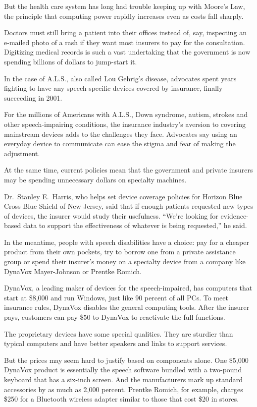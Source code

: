 ﻿\documentclass[12pt]{article}
\begin{document}
But the health care system has long had trouble keeping up with Moore's Law, the principle that
computing power rapidly increases even as costs fall sharply.

Doctors must still bring a patient into their offices instead of, say, inspecting an e-mailed photo
of a rash if they want most insurers to pay for the consultation. Digitizing medical records is such
a vast undertaking that the government is now spending billions of dollars to jump-start it.

In the case of A.L.S., also called Lou Gehrig's disease, advocates spent years fighting to have any
speech-specific devices covered by insurance, finally succeeding in 2001.

For the millions of Americans with A.L.S., Down syndrome, autism, strokes and other speech-impairing
conditions, the insurance industry's aversion to covering mainstream devices adds to the challenges
they face. Advocates say using an everyday device to communicate can ease the stigma and fear of
making the adjustment.

At the same time, current policies mean that the government and private insurers may be spending
unnecessary dollars on specialty machines.

Dr.~Stanley E.~Harris, who helps set device coverage policies for Horizon Blue Cross Blue Shield of
New Jersey, said that if enough patients requested new types of devices, the insurer would study
their usefulness. ``We're looking for evidence-based data to support the effectiveness of whatever
is being requested,'' he said.

In the meantime, people with speech disabilities have a choice: pay for a cheaper product from their
own pockets, try to borrow one from a private assistance group or spend their insurer's money on a
specialty device from a company like DynaVox Mayer-Johnson or Prentke Romich.

DynaVox, a leading maker of devices for the speech-impaired, has computers that start at \$8,000 and
run Windows, just like 90 percent of all PCs. To meet insurance rules, DynaVox disables the general
computing tools. After the insurer pays, customers can pay \$50 to DynaVox to reactivate the full
functions.

The proprietary devices have some special qualities. They are sturdier than typical computers and
have better speakers and links to support services.

But the prices may seem hard to justify based on components alone. One \$5,000 DynaVox product is
essentially the speech software bundled with a two-pound keyboard that has a six-inch screen. And
the manufacturers mark up standard accessories by as much as 2,000 percent. Prentke Romich, for
example, charges \$250 for a Bluetooth wireless adapter similar to those that cost \$20 in stores.
\end{document}
